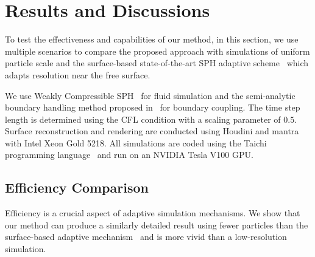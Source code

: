 \documentclass[VANCOUVER,STIX1COL]{WileyNJD-v2}
\begin{document}
\vspace{-1.5\baselineskip}

\section{Results and Discussions}


To test the effectiveness and capabilities of our method, in this section, we use multiple scenarios to compare the proposed approach with simulations of uniform particle scale and the surface-based state-of-the-art SPH adaptive scheme~\cite{Winchenbach17} which adapts resolution near the free surface.

We use Weakly Compressible SPH~\cite{Becker07} for fluid simulation and the semi-analytic boundary handling method proposed in~\cite{Winchenbach20} for boundary coupling. The time step length is determined using the CFL condition with a scaling parameter of $0.5$. Surface reconstruction and rendering are conducted using Houdini and mantra with Intel Xeon Gold 5218. All simulations are coded using the Taichi programming language~\cite{hu2019taichi} and run on an NVIDIA Tesla V100 GPU.

\subsection{Efficiency Comparison}

Efficiency is a crucial aspect of adaptive simulation mechanisms. We show that our method can produce a similarly detailed result using fewer particles than the surface-based adaptive mechanism~\cite{Winchenbach17} and is more vivid than a low-resolution simulation. 
\end{document}
